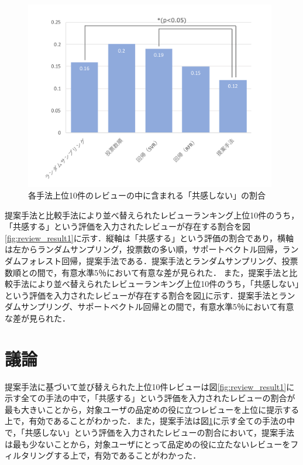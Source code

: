 \documentclass[a4paper,11pt,oneside,openany]{jsbook}
\begin{document}
\begin{figure}[tb]
	\begin{center} %
		\includegraphics [width = 110mm] {figures/review_result2.pdf} %
	\end{center}
	\caption{各手法上位10件のレビューの中に含まれる「共感しない」の割合} %
	\label{fig:review_result2} %
\end{figure}

提案手法と比較手法により並べ替えられたレビューランキング上位10件のうち，「共感する」という評価を入力されたレビューが存在する割合を図\ref{fig:review_result1}に示す．縦軸は「共感する」という評価の割合であり，横軸は左からランダムサンプリング，投票数の多い順，サポートベクトル回帰，ランダムフォレスト回帰，提案手法である．提案手法とランダムサンプリング、投票数順との間で，有意水準5％において有意な差が見られた．
また，提案手法と比較手法により並べ替えられたレビューランキング上位10件のうち，「共感しない」という評価を入力されたレビューが存在する割合を図\ref{fig:review_result2}に示す．提案手法とランダムサンプリング、サポートベクトル回帰との間で，有意水準5％において有意な差が見られた．
	\section{議論}
提案手法に基づいて並び替えられた上位10件レビューは図\ref{fig:review_result1}に示す全ての手法の中で，「共感する」という評価を入力されたレビューの割合が最も大きいことから，対象ユーザの品定めの役に立つレビューを上位に提示する上で，有効であることがわかった．また，提案手法は図\ref{fig:review_result2}に示す全ての手法の中で，「共感しない」という評価を入力されたレビューの割合において，提案手法は最も少ないことから，対象ユーザにとって品定めの役に立たないレビューをフィルタリングする上で，有効であることがわかった．
\end{document}
